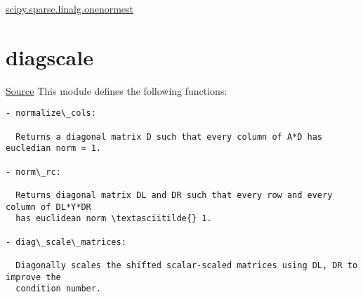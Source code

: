 \documentclass[letterpaper,10pt,english]{sphinxmanual}
\begin{document}


\href{http://docs.scipy.org/doc/scipy-dev/reference/generated/scipy.sparse.linalg.onenormest.html}{scipy.sparse.linalg.onenormest}




\section{diagscale}
\label{index:diagscale}
\href{https://bitbucket.org/akadar/brakesqueal0.1/src/master/brake/initialize/diagscale.py?at=master}{Source}
\label{index:module-brake.initialize.diagscale}
This module defines the following functions:

\begin{Verbatim}[commandchars=\\\{\}]
- normalize\_cols:

  Returns a diagonal matrix D such that every column of A*D has eucledian norm = 1. 
  
- norm\_rc:

  Returns diagonal matrix DL and DR such that every row and every column of DL*Y*DR
  has euclidean norm \textasciitilde{} 1.

- diag\_scale\_matrices:

  Diagonally scales the shifted scalar-scaled matrices using DL, DR to improve the
  condition number.
\end{Verbatim}
\end{document}
